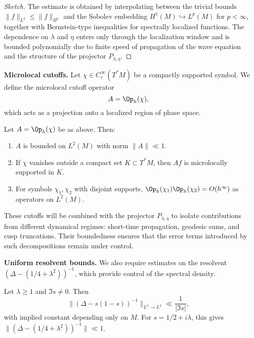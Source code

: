 \begin{proof}[Sketch]
The estimate is obtained by interpolating between the trivial bounds $\| f \|_{L^2} \leq \| f \|_{H^1}$ and the Sobolev embedding $H^1(M) \hookrightarrow L^p(M)$ for $p < \infty$, together with Bernstein-type inequalities for spectrally localized functions. The dependence on $\lambda$ and $\eta$ enters only through the localization window and is bounded polynomially due to finite speed of propagation of the wave equation and the structure of the projector $P_{\lambda,\eta}$.
\end{proof}

\medskip

\textbf{Microlocal cutoffs.} Let $\chi \in C_c^\infty(T^*M)$ be a compactly supported symbol. We define the microlocal cutoff operator
\[
A = \Op_h(\chi),
\]
which acts as a projection onto a localized region of phase space.

\begin{lemma}\label{lem:cutoffs}
Let $A = \Op_h(\chi)$ be as above. Then:
\begin{enumerate}
  \item $A$ is bounded on $L^2(M)$ with norm $\| A \| \ll 1$.
  \item If $\chi$ vanishes outside a compact set $K \subset T^*M$, then $A f$ is microlocally supported in $K$.
  \item For symbols $\chi_1, \chi_2$ with disjoint supports, $\Op_h(\chi_1)\Op_h(\chi_2) = O(h^\infty)$ as operators on $L^2(M)$.
\end{enumerate}
\end{lemma}

\begin{remark}
These cutoffs will be combined with the projector $P_{\lambda,\eta}$ to isolate contributions from different dynamical regimes: short-time propagation, geodesic sums, and cusp truncations. Their boundedness ensures that the error terms introduced by such decompositions remain under control.
\end{remark}

\medskip

\textbf{Uniform resolvent bounds.} We also require estimates on the resolvent $(\Delta - (1/4+\lambda^2))^{-1}$, which provide control of the spectral density.

\begin{proposition}\label{prop:resolvent}
Let $\lambda \geq 1$ and $\Im s \neq 0$. Then
\[
\| (\Delta - s(1-s))^{-1} \|_{L^2 \to L^2} \ll \frac{1}{|\Im s|},
\]
with implied constant depending only on $M$. For $s = 1/2 + i\lambda$, this gives $\| (\Delta - (1/4+\lambda^2))^{-1} \| \ll 1$.
\end{proposition}

